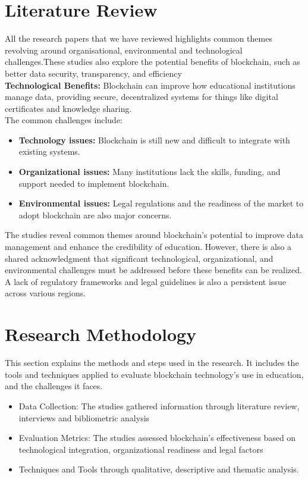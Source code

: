 \documentclass[a4paper, 12pt]{article}
\begin{document}
\section{Literature Review}
All the research papers that we have reviewed highlights common themes revolving around organisational, environmental and technological challenges.These studies also explore the potential benefits of blockchain, such as better data security, transparency, and efficiency\\

\textbf{Technological Benefits:} Blockchain can improve how educational institutions manage data, providing secure, decentralized systems for things like digital certificates and knowledge sharing.\\

The common challenges include:

\begin{itemize}
    \item \textbf{Technology issues:} Blockchain is still new and difficult to integrate with existing systems.
    \item \textbf{Organizational issues:} Many institutions lack the skills, funding, and support needed to implement blockchain.
    \item \textbf{Environmental issues:} Legal regulations and the readiness of the market to adopt blockchain are also major concerns.
\end{itemize}

The studies reveal common themes around blockchain's potential to improve data management and enhance the credibility of education. However, there is also a shared acknowledgment that significant technological, organizational, and environmental challenges must be addressed before these benefits can be realized. A lack of regulatory frameworks and legal guidelines is also a persistent issue across various regions.


\section{Research Methodology}
This section explains the methods and steps used in the research. It includes the tools and techniques applied to evaluate blockchain technology's use in education, and the challenges it faces.\\

\begin{itemize}
    \item Data Collection: The studies gathered information through literature review, interviews and bibliometric analysis
    \item Evaluation Metrics: The studies assessed blockchain's effectiveness based on technological integration, organizational readiness and legal factors
    \item Techniques and Tools through qualitative, descriptive and thematic analysis.
\end{itemize}
\end{document}
